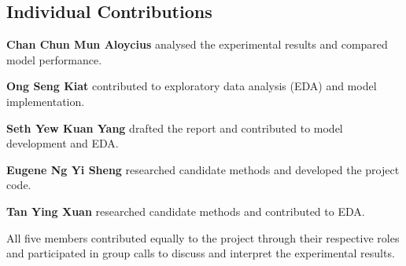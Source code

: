 \documentclass[letterpaper]{article}
\begin{document}
\subsection{Individual Contributions}
\textbf{Chan Chun Mun Aloycius} analysed the experimental results and compared model performance.

\textbf{Ong Seng Kiat} contributed to exploratory data analysis (EDA) and model implementation.

\textbf{Seth Yew Kuan Yang} drafted the report and contributed to model development and EDA.

\textbf{Eugene Ng Yi Sheng} researched candidate methods and developed the project code.

\textbf{Tan Ying Xuan} researched candidate methods and contributed to EDA.

All five members contributed equally to the project through their respective roles and participated in group calls to discuss and interpret the experimental results.


\end{document}
